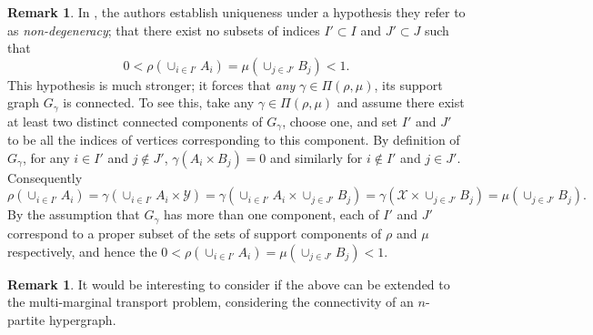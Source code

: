 \documentclass[11pt, oneside, titlepage]{book}
\theoremstyle{plain}
\theoremstyle{definition}
\newtheorem{remark}[theorem]{Remark}
\newcommand{\X}{\mathcal{X}}
\newcommand{\Y}{\mathcal{Y}}
\begin{document}
\begin{remark}
    In \cite{staudt2025uniqueness}, the authors establish uniqueness under a hypothesis they refer to as \textit{non-degeneracy}; that there exist no subsets of indices $I' \subset I$ and $J' \subset J$ such that
\begin{equation}
    \label{intro:eq: german nondegeneracy}
    0<\rho( \cup_{i \in I'} A_i) = \mu( \cup_{j \in J'} B_j)<1. 
\end{equation}
This hypothesis is much stronger; it forces that \textit{any} $\gamma \in \Pi(\rho, \mu)$, its support graph $G_\gamma$ is connected. To see this, take any $\gamma \in \Pi(\rho, \mu)$ and assume there exist at least two distinct connected components of $G_\gamma$, choose one, and set $I'$ and $J'$ to be all the indices of vertices corresponding to this component. By definition of $G_\gamma$, for any $i \in I'$ and $j \notin J'$, $\gamma(A_i \times B_j) = 0 $ and similarly for $i \notin I'$ and $j \in J'$. Consequently
\begin{equation*}
    \rho( \cup_{i \in I'} A_i) = \gamma( \cup_{i \in I'} A_i \times \Y) = \gamma( \cup_{i \in I'} A_i \times \cup_{j \in J'} B_j) = \gamma( \X \times \cup_{j \in J'} B_j) = \mu( \cup_{j \in J'} B_j).
\end{equation*}
By the assumption that $G_\gamma$ has more than one component, each of $I'$ and $J'$ correspond to a proper subset of the sets of support components of $\rho$ and $\mu$ respectively, and hence the $0< \rho( \cup_{i \in I'} A_i) = \mu( \cup_{j \in J'} B_j) < 1$.
\end{remark}

\begin{remark}
    It would be interesting to consider if the above can be extended to the multi-marginal transport problem, considering the connectivity of an $n$-partite hypergraph.
\end{remark}
\end{document}
